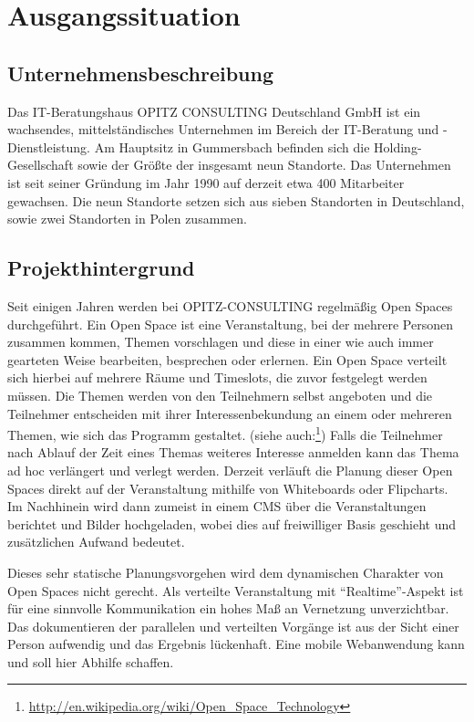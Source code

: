\section{Ausgangssituation}
\subsection{Unternehmensbeschreibung}
Das IT-Beratungshaus OPITZ CONSULTING Deutschland GmbH ist ein
wachsendes, mittelständisches Unternehmen im Bereich der IT-Beratung
und -Dienstleistung. Am Hauptsitz in Gummersbach befinden sich die
Holding-Gesellschaft sowie der Größte der insgesamt neun Standorte.
Das Unternehmen ist seit seiner Gründung im Jahr 1990 auf derzeit etwa
400 Mitarbeiter gewachsen. Die neun Standorte setzen sich aus sieben
Standorten in Deutschland, sowie zwei Standorten in Polen zusammen.
\subsection{Projekthintergrund}
Seit einigen Jahren werden bei OPITZ-CONSULTING regelmäßig Open Spaces
durchgeführt. Ein Open Space ist eine Veranstaltung, bei der mehrere
Personen zusammen kommen, Themen vorschlagen und diese in einer wie
auch immer gearteten Weise bearbeiten, besprechen oder erlernen. Ein
Open Space verteilt sich hierbei auf mehrere Räume und Timeslots, die
zuvor festgelegt werden müssen. Die Themen werden von den Teilnehmern
selbst angeboten und die Teilnehmer entscheiden mit ihrer
Interessenbekundung an einem oder mehreren Themen, wie sich das
Programm gestaltet. (siehe auch:\footnote{\url{http://en.wikipedia.org/wiki/Open_Space_Technology}})
Falls die Teilnehmer nach Ablauf der Zeit eines Themas weiteres
Interesse anmelden kann das Thema ad hoc verlängert und verlegt
werden.
\noindent Derzeit verläuft die Planung dieser Open Spaces direkt auf
der Veranstaltung mithilfe von Whiteboards oder Flipcharts. Im
Nachhinein wird dann zumeist in einem \gls{CMS} über die Veranstaltungen
berichtet und Bilder hochgeladen, wobei dies auf freiwilliger Basis
geschieht und zusätzlichen Aufwand bedeutet.

\noindent Dieses sehr statische Planungsvorgehen wird dem dynamischen
Charakter von Open Spaces nicht gerecht. Als verteilte Veranstaltung
mit ``Realtime''-Aspekt ist für eine sinnvolle Kommunikation ein hohes
Maß an Vernetzung unverzichtbar. Das dokumentieren der parallelen und
verteilten Vorgänge ist aus der Sicht einer Person aufwendig und das
Ergebnis lückenhaft. Eine mobile Webanwendung kann und soll hier
Abhilfe schaffen.


